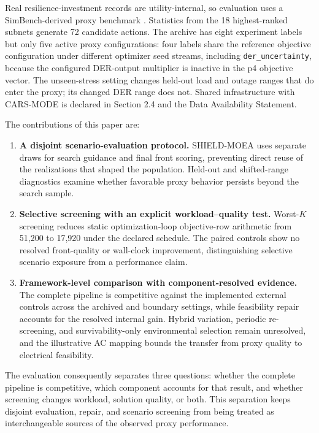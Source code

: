 \documentclass[energies,article,submit,moreauthors]{Definitions/mdpi}
\providecommand{\tightlist}{\setlength{\itemsep}{0pt}\setlength{\parskip}{0pt}}
\begin{document}
Real resilience-investment records are utility-internal, so evaluation uses a SimBench-derived proxy benchmark \cite{ref7}. Statistics from the 18 highest-ranked subnets generate 72 candidate actions. The archive has eight experiment labels but only five active proxy configurations: four labels share the reference objective configuration under different optimizer seed streams, including \texttt{der\_uncertainty}, because the configured DER-output multiplier is inactive in the p4 objective vector. The unseen-stress setting changes held-out load and outage ranges that do enter the proxy; its changed DER range does not. Shared infrastructure with CARS-MODE is declared in Section 2.4 and the Data Availability Statement.

The contributions of this paper are:

\begin{enumerate}
\def\labelenumi{\arabic{enumi}.}
\tightlist
\item
  \textbf{A disjoint scenario-evaluation protocol.} SHIELD-MOEA uses separate draws for search guidance and final front scoring, preventing direct reuse of the realizations that shaped the population. Held-out and shifted-range diagnostics examine whether favorable proxy behavior persists beyond the search sample.
\item
  \textbf{Selective screening with an explicit workload--quality test.} Worst-\(K\) screening reduces static optimization-loop objective-row arithmetic from 51,200 to 17,920 under the declared schedule. The paired controls show no resolved front-quality or wall-clock improvement, distinguishing selective scenario exposure from a performance claim.
\item
  \textbf{Framework-level comparison with component-resolved evidence.} The complete pipeline is competitive against the implemented external controls across the archived and boundary settings, while feasibility repair accounts for the resolved internal gain. Hybrid variation, periodic re-screening, and survivability-only environmental selection remain unresolved, and the illustrative AC mapping bounds the transfer from proxy quality to electrical feasibility.
\end{enumerate}

The evaluation consequently separates three questions: whether the complete pipeline is competitive, which component accounts for that result, and whether screening changes workload, solution quality, or both. This separation keeps disjoint evaluation, repair, and scenario screening from being treated as interchangeable sources of the observed proxy performance.
\end{document}
